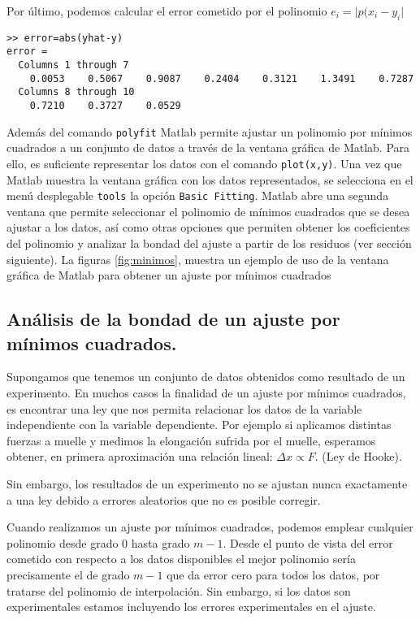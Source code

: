 Por último, podemos calcular el error cometido por el polinomio $e_i=\vert p(x_i-y_i \vert$
\begin{verbatim}
>> error=abs(yhat-y)
error =
  Columns 1 through 7
    0.0053    0.5067    0.9087    0.2404    0.3121    1.3491    0.7287
  Columns 8 through 10
    0.7210    0.3727    0.0529
\end{verbatim} 
Además del comando \texttt{polyfit} Matlab permite ajustar un polinomio por mínimos cuadrados a un conjunto de datos a través de la ventana gráfica de Matlab. Para ello, es suficiente representar los datos con el comando \texttt{plot(x,y)}. Una vez que Matlab muestra la ventana gráfica con los datos representados, se selecciona en el menú desplegable \texttt{tools} la opción \texttt{Basic Fitting}. Matlab abre una segunda ventana que permite seleccionar el polinomio de mínimos cuadrados que se desea ajustar a los datos, así como otras opciones que permiten obtener los coeficientes del polinomio y analizar la bondad del ajuste a partir de los residuos (ver sección siguiente). La figuras \ref{fig:minimos}, muestra un ejemplo de uso de la ventana gráfica de Matlab para obtener un ajuste por mínimos cuadrados 


\subsection{Análisis de la bondad de un ajuste por mínimos cuadrados.} 
Supongamos que tenemos un conjunto de datos obtenidos como resultado de un experimento. En muchos casos la finalidad de un ajuste por mínimos cuadrados, es encontrar una ley que nos permita relacionar los datos de la variable independiente con la variable dependiente. Por ejemplo si aplicamos distintas fuerzas a muelle y medimos la elongación sufrida por el muelle, esperamos obtener, en primera aproximación una relación lineal: $\Delta x\propto F$. (Ley de Hooke). 

Sin embargo, los resultados de un experimento no se ajustan nunca exactamente a una ley debido a errores aleatorios que no es posible corregir.

Cuando realizamos un ajuste por mínimos cuadrados, podemos emplear cualquier polinomio desde grado $0$ hasta grado $m-1$. Desde el punto de vista del error cometido con respecto a los datos disponibles el mejor polinomio sería precisamente el de grado $m-1$ que da error cero para todos los datos, por tratarse del polinomio de interpolación. Sin embargo, si los datos son experimentales estamos incluyendo los errores experimentales en el ajuste.

